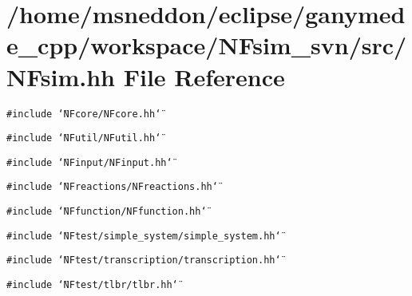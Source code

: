\section{/home/msneddon/eclipse/ganymede\_\-cpp/workspace/NFsim\_\-svn/src/NFsim.hh File Reference}
\label{NFsim_8hh}


{\tt \#include \char`\"{}NFcore/NFcore.hh\char`\"{}}\par
{\tt \#include \char`\"{}NFutil/NFutil.hh\char`\"{}}\par
{\tt \#include \char`\"{}NFinput/NFinput.hh\char`\"{}}\par
{\tt \#include \char`\"{}NFreactions/NFreactions.hh\char`\"{}}\par
{\tt \#include \char`\"{}NFfunction/NFfunction.hh\char`\"{}}\par
{\tt \#include \char`\"{}NFtest/simple\_\-system/simple\_\-system.hh\char`\"{}}\par
{\tt \#include \char`\"{}NFtest/transcription/transcription.hh\char`\"{}}\par
{\tt \#include \char`\"{}NFtest/tlbr/tlbr.hh\char`\"{}}\par
